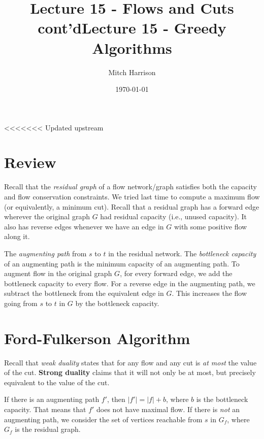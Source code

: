 \documentclass[titlepage, 12pt, leqno]{article}
\title{\Huge{Lecture 15 - Flows and Cuts cont'd}}
\title{\Huge{Lecture 15 - Greedy Algorithms}}
\author{\large{Mitch Harrison}}
\date{\today}
\begin{document}
\setlength{\parskip}{1\baselineskip}
\setlength{\parindent}{15pt}
\maketitle
\tableofcontents
\newpage


<<<<<<< Updated upstream
\section{Review}

Recall that the \textit{residual graph} of a flow network/graph satisfies both
the capacity and flow conservation constraints. We tried last time to compute a
maximum flow (or equivalently, a minimum cut). Recall that a residual graph has
a forward edge wherever the original graph $G$ had residual capacity (i.e.,
unused capacity). It also has reverse edges whenever we have an edge in $G$ with
some positive flow along it.

The \textit{augmenting path} from $s$ to $t$ in the residual network. The
\textit{bottleneck capacity} of an augmenting path is the minimum capacity of an
augmenting path. To augment flow in the original graph $G$, for every forward
edge, we add the bottleneck capacity to every flow. For a reverse edge in the
augmenting path, we subtract the bottleneck from the equivalent edge in $G$. 
This increases the flow going from $s$ to $t$ in $G$ by the bottleneck capacity.

\pagebreak
\section{Ford-Fulkerson Algorithm}
Recall that \textit{weak duality} states that for any flow and any cut is
\textit{at most} the value of the cut. \textbf{Strong duality} claims that it 
will not only be at most, but precisely equivalent to the value of the cut.

If there is an augmenting path $f'$, then $|f'| = |f| + b$, where $b$ is the
bottleneck capacity. That means that $f'$ does not have maximal flow. If there
is \textit{not} an augmenting path, we consider the set of vertices reachable
from $s$ in $G_{f}$, where $G_{f}$ is the residual graph.
\end{document}
